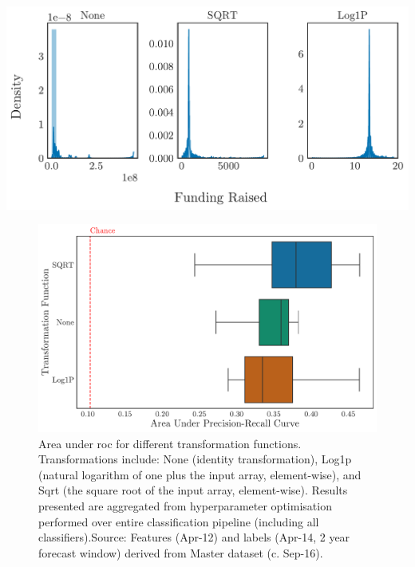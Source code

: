 \documentclass[../thesis/thesis.tex]{subfiles}
\begin{document}
\begin{table}[!htb]
    \centering
    \includegraphics[width=\textwidth]{../figures/design/funding_transformation}
    \caption[Example feature under transformation functions]{}
    \label{fig:design:funding_transformation}
\end{table}

\begin{figure}[!htb]
    \centering
    \includegraphics[width=\textwidth]{../figures/design/transformer}
    \caption[Area under PR Curves by transformation function]{Area under \gls{roc} for different transformation functions. Transformations include: None (identity transformation), Log1p (natural logarithm of one plus the input array, element-wise), and Sqrt (the square root of the input array, element-wise). Results presented are aggregated from hyperparameter optimisation performed over entire classification pipeline (including all classifiers).Source: Features (Apr-12) and labels (Apr-14, 2 year forecast window) derived from Master dataset (c. Sep-16).}
    \label{fig:design:transformer}
\end{figure}
\end{document}
